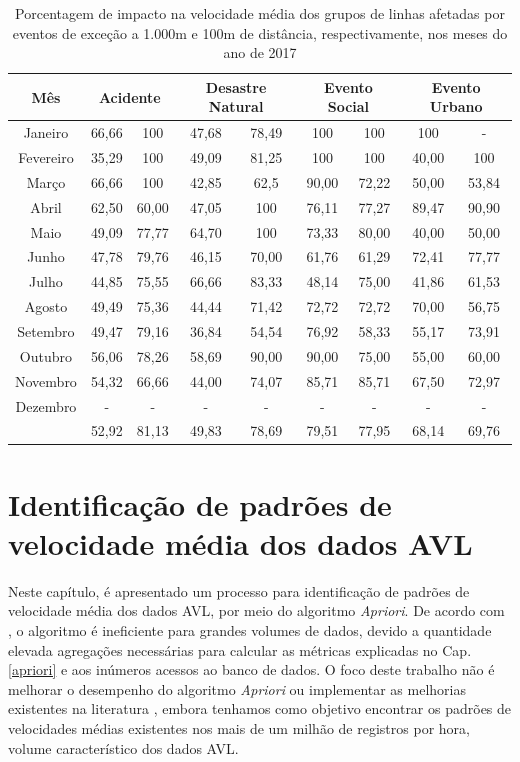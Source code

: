 \documentclass[
	12pt,				%
	oneside,			%
	a4paper,			%
	english,			%
	brazil				%
	]{abntex2ppgsi}
\begin{document}
{{\begin{table}[!htb]
\centering
\caption {Porcentagem de impacto na velocidade média dos grupos de linhas afetadas por eventos de exceção a 1.000m e 100m de distância, respectivamente, nos meses do ano de 2017}
\label{tab:exceptEventVelocityImpAllShapes}
\begin{tabular}{c|cc|cc|cc|cc}
\toprule
\textbf{Mês} & \multicolumn{2}{c}{\textbf{Acidente}} & \multicolumn{2}{c}{\textbf{Desastre Natural}} & \multicolumn{2}{c}{\textbf{Evento Social}} &
\multicolumn{2}{c}{\textbf{Evento Urbano}}\\
\midrule
Janeiro & 66,66 &  100 & 
 47,68 &  78,49 & 
 100 & 100 &
 100 & - \\
\hline
Fevereiro & 35,29  &  100 &
 49,09 &  81,25 &
 100 & 100 &
 40,00 & 100 \\
\hline
Março  & 66,66  &  100 & 
 42,85 &  62,5 &
90,00 & 72,22 &
50,00 & 53,84 \\
\hline
Abril & 62,50 & 60,00 & 
47,05  & 100 & 
76,11 & 77,27 & 
89,47 &  90,90\\
\hline
Maio & 49,09 &  77,77 &
64,70 &  100 &
73,33 & 80,00 &
40,00 & 50,00 \\
\hline
Junho & 47,78 &  79,76 &
 46,15 &  70,00 &
 61,76 & 61,29 &
72,41 & 77,77 \\
\hline
Julho & 44,85  &  75,55 &
 66,66  & 83,33 &
48,14  & 75,00 &
41,86 & 61,53 \\
\hline
Agosto & 49,49 & 75,36 &
  44,44 & 71,42 &
  72,72 & 72,72 & 
70,00  & 56,75 \\
\hline
Setembro & 49,47  & 79,16 &
36,84  & 54,54 &
76,92  & 58,33 & 
55,17 & 73,91 \\
\hline
Outubro & 56,06 & 78,26 &
58,69  & 90,00 &
90,00  & 75,00 &
55,00 & 60,00 \\
\hline
Novembro & 54,32 & 66,66 &
 44,00 & 74,07 &
85,71  & 85,71 &
67,50  & 72,97 \\
\hline
Dezembro & - & - & - & - & - & - & - & -  \\
\midrule
{} & 52,92 & 81,13 & 49,83 & 78,69 & 79,51 & 77,95 & 68,14 & 69,76  \\
\bottomrule
\end{tabular}
\end{table}


\chapter{Identificação de padrões de velocidade média dos dados AVL}
\label{expApriori}
Neste capítulo, é apresentado um processo para identificação de padrões de velocidade média dos dados AVL, por meio do algoritmo \textit{Apriori}. De acordo com \cite{xie2008optimization}, o algoritmo é ineficiente para grandes volumes de dados, devido a quantidade elevada agregações necessárias para calcular as métricas explicadas no Cap. \ref{apriori} e aos inúmeros acessos ao banco de dados. O foco deste trabalho não é melhorar o desempenho do algoritmo \textit{Apriori} ou implementar as melhorias existentes na literatura \cite{xie2008optimization, zhang2014method}, embora tenhamos como objetivo encontrar os padrões de velocidades médias existentes nos mais de um milhão de registros por hora, volume característico dos dados AVL.

}}
\end{document}
